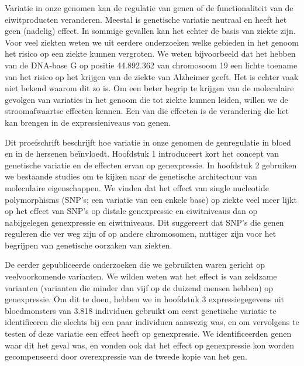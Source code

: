 \begin{appendices}
Variatie in onze genomen kan de regulatie van genen of de functionaliteit van de eiwitproducten veranderen. Meestal is genetische variatie neutraal en heeft het geen (nadelig) effect. In sommige gevallen kan het echter de basis van ziekte zijn. Voor veel ziekten weten we uit eerdere onderzoeken welke gebieden in het genoom het risico op een ziekte kunnen vergroten. We weten bijvoorbeeld dat het hebben van de DNA-base G op positie 44.892.362 van chromosoom 19 een lichte toename van het risico op het krijgen van de ziekte van Alzheimer geeft. Het is echter vaak niet bekend waarom dit zo is. Om een beter begrip te krijgen van de moleculaire gevolgen van variaties in het genoom  die tot ziekte kunnen leiden, willen we de stroomafwaartse effecten kennen. Een van die effecten is de verandering die het kan brengen in de expressieniveaus van genen.

Dit proefschrift beschrijft hoe variatie in onze genomen de genregulatie in bloed en in de hersenen beïnvloedt. Hoofdstuk 1 introduceert kort het concept van genetische variatie en de effecten ervan op genexpressie. In hoofdstuk 2 gebruiken we bestaande studies om te kijken naar de genetische architectuur van moleculaire eigenschappen. We vinden dat het effect van single nucleotide polymorphisms (SNP's; een variatie van een enkele base) op ziekte veel meer lijkt op het effect van SNP's op distale genexpressie en eiwitniveaus dan op nabijgelegen genexpressie en eiwitniveaus. Dit suggereert dat SNP's die genen reguleren die ver weg zijn of op andere chromosomen, nuttiger zijn voor het begrijpen van genetische oorzaken van ziekten.

De eerder gepubliceerde onderzoeken die we gebruikten waren gericht op veelvoorkomende varianten. We wilden weten wat het effect is van zeldzame varianten (varianten die minder dan vijf op de duizend mensen hebben) op genexpressie. Om dit te doen, hebben we in hoofdstuk 3 expressiegegevens uit bloedmonsters van 3.818 individuen gebruikt om eerst genetische variatie te identificeren die slechts bij een paar individuen aanwezig was, en om vervolgens te testen of deze variatie een effect heeft op genexpressie. We identificeerden genen waar dit het geval was, en vonden ook dat het effect op genexpressie kon worden gecompenseerd door overexpressie van de tweede kopie van het gen.


\end{appendices}
